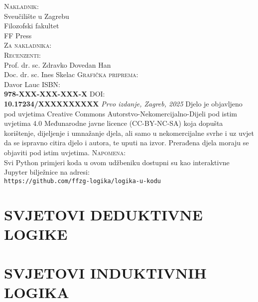 \documentclass[11pt,a4paper,twoside,openright]{book}
\theoremstyle{definition}
\theoremstyle{plain}
\theoremstyle{remark}
\begin{document}
\frontmatter

\newpage
\thispagestyle{empty}
\vspace*{\fill}
\noindent
\setlength{\parindent}{0pt}
\setlength{\parskip}{\baselineskip}
\textsc{Nakladnik}: \\
Sveučilište u Zagrebu \\
Filozofski fakultet \\
FF Press \\
\vspace{0.7cm}
\textsc{Za nakladnika}:\\
\vspace{0.7cm}
\textsc{Recenzenti}: \\
Prof. dr. sc. Zdravko Dovedan Han \\
Doc. dr. sc. Ines Skelac
\vspace{0.7cm}
\textsc{Grafička priprema}: \\
Davor Lauc
\vspace{0.7cm}
\textsc{ISBN:} \\ {\bfseries 978-XXX-XXX-XXX-X}
\textsc{DOI:} \\ {\bfseries 10.17234/XXXXXXXXXX}
\vspace{0.7cm}
\textit{Prvo izdanje, Zagreb, 2025}
\vspace{0.7cm}
Djelo je objavljeno pod uvjetima Creative Commons Autorstvo-Nekomercijalno-Dijeli pod istim uvjetima 4.0 Međunarodne javne licence (CC-BY-NC-SA) koja dopušta korištenje, dijeljenje i umnažanje djela, ali samo u nekomercijalne svrhe i uz uvjet da se ispravno citira djelo i autora, te uputi na izvor. Prerađena djela moraju se objaviti pod istim uvjetima.
\vspace{0.5cm}
\textsc{Napomena}: \\
Svi Python primjeri koda u ovom udžbeniku dostupni su kao interaktivne Jupyter bilježnice na adresi: \\
\texttt{https://github.com/ffzg-logika/logika-u-kodu}
\vspace*{\fill}

\tableofcontents



\mainmatter


\part{SVJETOVI DEDUKTIVNE LOGIKE}






\part{SVJETOVI INDUKTIVNIH LOGIKA}




\appendix


\backmatter
% 
% 
\end{document}
